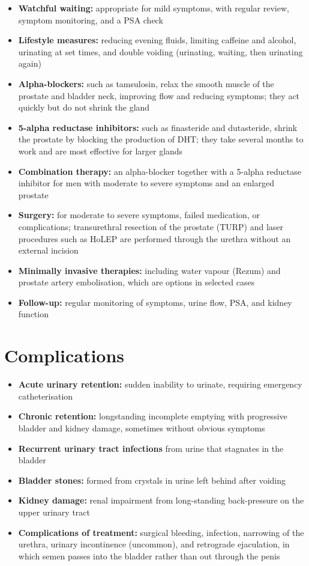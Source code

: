 \begin{itemize}
    \item \textbf{Watchful waiting:} appropriate for mild symptoms, with regular review, symptom monitoring, and a PSA check
    \item \textbf{Lifestyle measures:} reducing evening fluids, limiting caffeine and alcohol, urinating at set times, and double voiding (urinating, waiting, then urinating again)
    \item \textbf{Alpha-blockers:} such as tamsulosin, relax the smooth muscle of the prostate and bladder neck, improving flow and reducing symptoms; they act quickly but do not shrink the gland
    \item \textbf{5-alpha reductase inhibitors:} such as finasteride and dutasteride, shrink the prostate by blocking the production of DHT; they take several months to work and are most effective for larger glands
    \item \textbf{Combination therapy:} an alpha-blocker together with a 5-alpha reductase inhibitor for men with moderate to severe symptoms and an enlarged prostate
    \item \textbf{Surgery:} for moderate to severe symptoms, failed medication, or complications; transurethral resection of the prostate (TURP) and laser procedures such as HoLEP are performed through the urethra without an external incision
    \item \textbf{Minimally invasive therapies:} including water vapour (Rezum) and prostate artery embolisation, which are options in selected cases
    \item \textbf{Follow-up:} regular monitoring of symptoms, urine flow, PSA, and kidney function
\end{itemize}

\section*{Complications}
\begin{itemize}
    \item \textbf{Acute urinary retention:} sudden inability to urinate, requiring emergency catheterisation
    \item \textbf{Chronic retention:} longstanding incomplete emptying with progressive bladder and kidney damage, sometimes without obvious symptoms
    \item \textbf{Recurrent urinary tract infections} from urine that stagnates in the bladder
    \item \textbf{Bladder stones:} formed from crystals in urine left behind after voiding
    \item \textbf{Kidney damage:} renal impairment from long-standing back-pressure on the upper urinary tract
    \item \textbf{Complications of treatment:} surgical bleeding, infection, narrowing of the urethra, urinary incontinence (uncommon), and retrograde ejaculation, in which semen passes into the bladder rather than out through the penis
\end{itemize}

